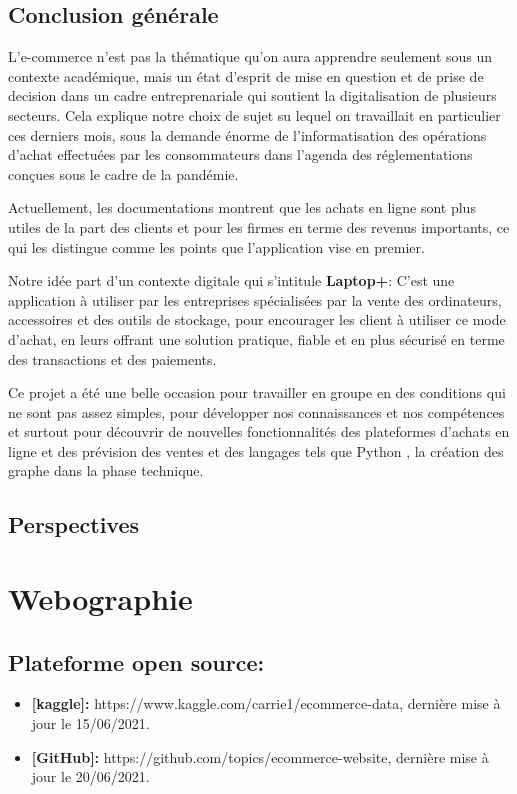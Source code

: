 \documentclass[a4paper]{report}
\begin{document}
\begin{doublespace}
	\section{Conclusion générale}
	L'e-commerce n'est pas la thématique qu'on aura
	apprendre seulement sous un contexte académique, mais un état d'esprit de mise
	en question et de prise de decision dans un cadre entreprenariale qui soutient
	la digitalisation de plusieurs secteurs. Cela explique notre choix de sujet su
	lequel on travaillait en particulier ces derniers mois, sous la demande énorme
	de l'informatisation des opérations d'achat effectuées par les consommateurs
	dans l'agenda des réglementations conçues sous le cadre de la pandémie.

	Actuellement, les documentations montrent que les
	achats en ligne sont plus utiles de la part des clients et pour les firmes en
	terme des revenus importants, ce qui les distingue comme les points que
	l'application vise en premier.

	Notre idée part d'un contexte digitale qui s'intitule
	\textbf{Laptop+}: C’est une application à utiliser par les entreprises
	spécialisées par la vente des ordinateurs, accessoires et des outils de
	stockage, pour encourager les client à utiliser ce mode d'achat, en leurs
	offrant une solution pratique, fiable et en plus  sécurisé en terme des
	transactions et des paiements.

	Ce projet a été une belle occasion pour travailler en
	groupe en des conditions qui ne sont pas assez simples, pour développer nos
	connaissances et nos compétences et surtout pour
	découvrir de nouvelles fonctionnalités des plateformes d'achats en ligne et des
	prévision des ventes et des langages tels que Python , la création des graphe
	dans la phase technique.
	\section{Perspectives}
\end{doublespace}
\chapter{Webographie}
\fancyhead[L]{\hspace*{5cm}}
\section{Plateforme open source:}
\begin{itemize}
	\item \textbf{[kaggle]:}
	      https://www.kaggle.com/carrie1/ecommerce-data, dernière mise à jour le
	      15/06/2021.
	\item \textbf{[GitHub]:}
	      https://github.com/topics/ecommerce-website, dernière mise à jour le
	      20/06/2021.
\end{itemize}
\end{document}
